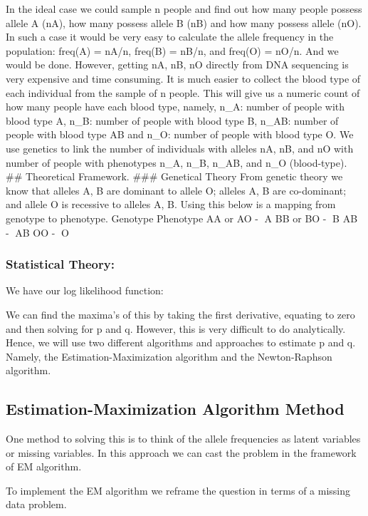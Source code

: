 \documentclass[]{article}
\begin{document}
In the ideal case we could sample n people and find out how many people
possess allele A (nA), how many possess allele B (nB) and how many
possess allele (nO). In such a case it would be very easy to calculate
the allele frequency in the population: freq(A) = nA/n, freq(B) = nB/n,
and freq(O) = nO/n. And we would be done. However, getting nA, nB, nO
directly from DNA sequencing is very expensive and time consuming. It is
much easier to collect the blood type of each individual from the sample
of n people. This will give us a numeric count of how many people have
each blood type, namely, n\_A: number of people with blood type A, n\_B:
number of people with blood type B, n\_AB: number of people with blood
type AB and n\_O: number of people with blood type O. We use genetics to
link the number of individuals with alleles nA, nB, and nO with number
of people with phenotypes n\_A, n\_B, n\_AB, and n\_O (blood-type). \#\#
Theoretical Framework. \#\#\# Genetical Theory From genetic theory we
know that alleles A, B are dominant to allele O; alleles A, B are
co-dominant; and allele O is recessive to alleles A, B. Using this below
is a mapping from genotype to phenotype. Genotype Phenotype AA or AO -
A BB or BO - B AB - AB OO - O

\subsubsection{Statistical Theory:}\label{statistical-theory}

We have our log likelihood function:

We can find the maxima's of this by taking the first derivative,
equating to zero and then solving for p and q. However, this is very
difficult to do analytically. Hence, we will use two different
algorithms and approaches to estimate p and q. Namely, the
Estimation-Maximization algorithm and the Newton-Raphson algorithm.

\subsection{Estimation-Maximization Algorithm
Method}\label{estimation-maximization-algorithm-method}

One method to solving this is to think of the allele frequencies as
latent variables or missing variables. In this approach we can cast the
problem in the framework of EM algorithm.

To implement the EM algorithm we reframe the question in terms of a
missing data problem.
\end{document}
